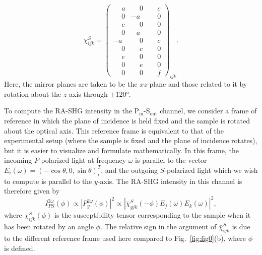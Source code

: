 \begin{equation}
\label{eq:Sc3vsusceptibility}
\chi^S_{ijk} = \begin{pmatrix}
\phantom{-}a & \phantom{-}0 & \phantom{-}c\\
\phantom{-}0 & -a & \phantom{-}0\\
\phantom{-}c & \phantom{-}0 & \phantom{-}0\\
\hline
\phantom{-}0 & -a & \phantom{-}0\\
-a & \phantom{-}0 & \phantom{-}c\\
\phantom{-}0 & \phantom{-}c & \phantom{-}0\\
\hline
\phantom{-}e & \phantom{-}0 & \phantom{-}0\\
\phantom{-}0 & \phantom{-}e & \phantom{-}0\\
\phantom{-}0 & \phantom{-}0 & \phantom{-}f
\end{pmatrix}_{ijk}.
\end{equation}
Here, the mirror planes are taken to be the $xz$-plane and those related to it by rotation about the $z$-axis through $\pm \ang{120}$.

To compute the RA-SHG intensity in the P$_\mathrm{in}$-S$_\mathrm{out}$ channel, we consider a frame of reference in which the plane of incidence is held fixed and the sample is rotated about the optical axis.
This reference frame is equivalent to that of the experimental setup (where the sample is fixed and the plane of incidence rotates), but it is easier to visualize and formulate mathematically.
In this frame, the incoming $P$-polarized light at frequency $\omega$ is parallel to the vector $E_i(\omega) = (-\cos{\theta}, 0, \sin{\theta})^T_i$, and the outgoing $S$-polarized light which we wish to compute is parallel to the $y$-axis.
The RA-SHG intensity in this channel is therefore given by
\begin{equation}
\label{eq:Sipsequation}
I_{PS}^{2\omega}(\phi) \propto \left|P_y^{2\omega}(\phi)\right|^2 \propto \left|\bar{\chi}^S_{yjk}(-\phi)E_j(\omega)E_k(\omega)\right|^2,
\end{equation}
where $\bar{\chi}^S_{ijk}(\phi)$ is the susceptibility tensor corresponding to the sample when it has been rotated by an angle $\phi$.
The relative sign in the argument of $\bar{\chi}^S_{ijk}$ is due to the different reference frame used here compared to Fig.~\ref{fig:fig0}(b), where $\phi$ is defined.

